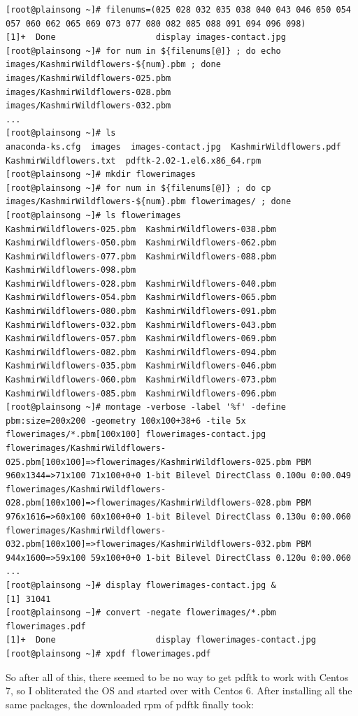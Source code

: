 \documentclass[10pt]{article}
\begin{document}
\begin{Verbatim}[fontsize=\scriptsize]
[root@plainsong ~]# filenums=(025 028 032 035 038 040 043 046 050 054 057 060 062 065 069 073 077 080 082 085 088 091 094 096 098)
[1]+  Done                    display images-contact.jpg
[root@plainsong ~]# for num in ${filenums[@]} ; do echo images/KashmirWildflowers-${num}.pbm ; done
images/KashmirWildflowers-025.pbm
images/KashmirWildflowers-028.pbm
images/KashmirWildflowers-032.pbm
...
[root@plainsong ~]# ls
anaconda-ks.cfg  images  images-contact.jpg  KashmirWildflowers.pdf  KashmirWildflowers.txt  pdftk-2.02-1.el6.x86_64.rpm
[root@plainsong ~]# mkdir flowerimages
[root@plainsong ~]# for num in ${filenums[@]} ; do cp images/KashmirWildflowers-${num}.pbm flowerimages/ ; done
[root@plainsong ~]# ls flowerimages
KashmirWildflowers-025.pbm  KashmirWildflowers-038.pbm  KashmirWildflowers-050.pbm  KashmirWildflowers-062.pbm  KashmirWildflowers-077.pbm  KashmirWildflowers-088.pbm  KashmirWildflowers-098.pbm
KashmirWildflowers-028.pbm  KashmirWildflowers-040.pbm  KashmirWildflowers-054.pbm  KashmirWildflowers-065.pbm  KashmirWildflowers-080.pbm  KashmirWildflowers-091.pbm
KashmirWildflowers-032.pbm  KashmirWildflowers-043.pbm  KashmirWildflowers-057.pbm  KashmirWildflowers-069.pbm  KashmirWildflowers-082.pbm  KashmirWildflowers-094.pbm
KashmirWildflowers-035.pbm  KashmirWildflowers-046.pbm  KashmirWildflowers-060.pbm  KashmirWildflowers-073.pbm  KashmirWildflowers-085.pbm  KashmirWildflowers-096.pbm
[root@plainsong ~]# montage -verbose -label '%f' -define pbm:size=200x200 -geometry 100x100+38+6 -tile 5x flowerimages/*.pbm[100x100] flowerimages-contact.jpg
flowerimages/KashmirWildflowers-025.pbm[100x100]=>flowerimages/KashmirWildflowers-025.pbm PBM 960x1344=>71x100 71x100+0+0 1-bit Bilevel DirectClass 0.100u 0:00.049
flowerimages/KashmirWildflowers-028.pbm[100x100]=>flowerimages/KashmirWildflowers-028.pbm PBM 976x1616=>60x100 60x100+0+0 1-bit Bilevel DirectClass 0.130u 0:00.060
flowerimages/KashmirWildflowers-032.pbm[100x100]=>flowerimages/KashmirWildflowers-032.pbm PBM 944x1600=>59x100 59x100+0+0 1-bit Bilevel DirectClass 0.120u 0:00.060
...
[root@plainsong ~]# display flowerimages-contact.jpg &
[1] 31041
[root@plainsong ~]# convert -negate flowerimages/*.pbm flowerimages.pdf
[1]+  Done                    display flowerimages-contact.jpg
[root@plainsong ~]# xpdf flowerimages.pdf 
\end{Verbatim}
So after all of this, there seemed to be no way to get pdftk to work with Centos 7, so I obliterated the OS and started over with Centos 6. After installing all the same packages, the downloaded rpm of pdftk finally took:
\end{document}
